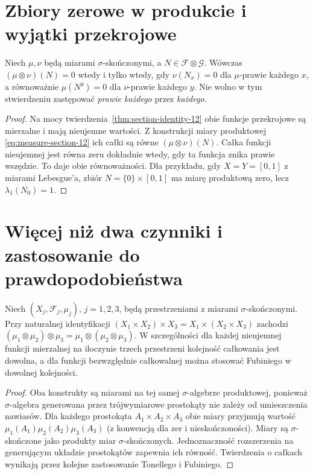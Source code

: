 \section{Zbiory zerowe w produkcie i wyjątki przekrojowe}

\begin{wniosek}
\label{cor:null-sections-12}
Niech $\mu,\nu$ będą miarami $\sigma$-skończonymi,
a $N\in\mathcal F\otimes\mathcal G$. Wówczas
$(\mu\otimes\nu)(N)=0$ wtedy i tylko wtedy, gdy
$\nu(N_x)=0$ dla $\mu$-prawie każdego $x$, a równoważnie
$\mu(N^y)=0$ dla $\nu$-prawie każdego $y$.
Nie wolno w tym stwierdzeniu zastępować
\emph{prawie każdego} przez \emph{każdego}.
\end{wniosek}
\begin{proof}
Na mocy twierdzenia~\ref{thm:section-identity-12}
obie funkcje przekrojowe są mierzalne i mają
nieujemne wartości. Z konstrukcji miary produktowej
\eqref{eq:measure-section-12} ich całki są równe
$(\mu\otimes\nu)(N)$. Całka funkcji nieujemnej
jest równa zeru dokładnie wtedy, gdy ta funkcja
znika prawie wszędzie. To daje obie równoważności.
Dla przykładu, gdy $X=Y=[0,1]$ z miarami Lebesgue'a,
zbiór $N=\{0\}\times[0,1]$ ma miarę produktową zero,
lecz $\lambda_1(N_0)=1$.
\end{proof}

\section{Więcej niż dwa czynniki i zastosowanie do prawdopodobieństwa}

\begin{wniosek}
\label{cor:associative-product-12}
Niech $(X_j,\mathcal F_j,\mu_j)$, $j=1,2,3$,
będą przestrzeniami z miarami $\sigma$-skończonymi.
Przy naturalnej identyfikacji
$(X_1\times X_2)\times X_3=X_1\times(X_2\times X_3)$
zachodzi
$(\mu_1\otimes\mu_2)\otimes\mu_3
=\mu_1\otimes(\mu_2\otimes\mu_3)$.
W szczególności dla każdej nieujemnej funkcji
mierzalnej na iloczynie trzech przestrzeni
kolejność całkowania jest dowolna, a dla funkcji
bezwzględnie całkowalnej można stosować Fubiniego
w dowolnej kolejności.
\end{wniosek}
\begin{proof}
Oba konstrukty są miarami na tej samej
$\sigma$-algebrze produktowej, ponieważ
$\sigma$-algebra generowana przez trójwymiarowe
prostokąty nie zależy od umieszczenia nawiasów.
Dla każdego prostokąta $A_1\times A_2\times A_3$
obie miary przyjmują wartość
$\mu_1(A_1)\mu_2(A_2)\mu_3(A_3)$
(z konwencją dla zer i nieskończoności).
Miary są $\sigma$-skończone jako produkty miar
$\sigma$-skończonych. Jednoznaczność rozszerzenia
na generującym układzie prostokątów zapewnia ich
równość. Twierdzenia o całkach wynikają przez
kolejne zastosowanie Tonellego i Fubiniego.
\end{proof}

